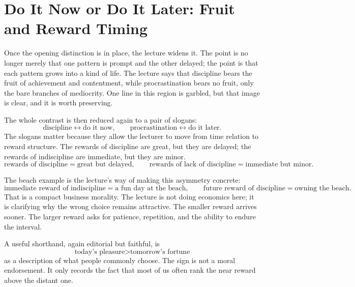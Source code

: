 \section{Do It Now or Do It Later: Fruit and Reward Timing}

Once the opening distinction is in place, the lecture widens it. The point is no longer merely that one pattern is prompt and the other delayed; the point is that each pattern grows into a kind of life. The lecture says that discipline bears the fruit of achievement and contentment, while procrastination bears no fruit, only the bare branches of mediocrity. One line in this region is garbled, but that image is clear, and it is worth preserving.

The whole contrast is then reduced again to a pair of slogans:
\begin{equation}
\text{discipline} \leftrightarrow \text{do it now}, \qquad
\text{procrastination} \leftrightarrow \text{do it later}.
\end{equation}
The slogans matter because they allow the lecturer to move from time relation to reward structure. The rewards of discipline are great, but they are delayed; the rewards of indiscipline are immediate, but they are minor.
\begin{equation}
\text{rewards of discipline} = \text{great but delayed}, \qquad
\text{rewards of lack of discipline} = \text{immediate but minor}.
\end{equation}

The beach example is the lecture's way of making this asymmetry concrete:
\begin{equation}
\text{immediate reward of indiscipline} = \text{a fun day at the beach}, \qquad
\text{future reward of discipline} = \text{owning the beach}.
\end{equation}
That is a compact business morality. The lecture is not doing economics here; it is clarifying why the wrong choice remains attractive. The smaller reward arrives sooner. The larger reward asks for patience, repetition, and the ability to endure the interval.

A useful shorthand, again editorial but faithful, is
\begin{equation}
\text{today's pleasure} > \text{tomorrow's fortune}
\end{equation}
as a description of what people commonly choose. The sign is not a moral endorsement. It only records the fact that most of us often rank the near reward above the distant one.


